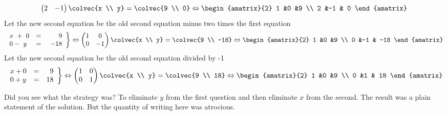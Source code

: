 \begin{example}
\[\begin{pmatrix}
      2             &-1
    \end{pmatrix}
  \colvec{x \\ y}
  =
  \colvec{9 \\ 0}
  \Leftrightarrow
 \begin{amatrix}{2}
1 &0 &9 \\ 2 &-1 & 0
\end{amatrix}
\]
Let the new second equation be the old second equation minus two times the first equation 
\[
   \left.
\begin{array}{lcr}
	x\ +\ 0 & = & 9 \\
	0-\ y & = &\  -18
     \end{array}
   \right\} 
   \Leftrightarrow
    \begin{pmatrix}
      1             &0  \\
      0             &-1
    \end{pmatrix}
  \colvec{x \\ y}
  =
  \colvec{9 \\ -18}
  \Leftrightarrow
 \begin{amatrix}{2}
1 &0 &9 \\ 0 &-1 & -18
\end{amatrix}
\]
Let the new  second equation be the old second equation divided by -1
\[
   \left.
\begin{array}{lcr}
	x + 0 & = & \ 9 \\
	0 + y & = &  18
     \end{array}
   \right\} 
   \Leftrightarrow
    \begin{pmatrix}
      1             &0  \\
      0             &1
    \end{pmatrix}
  \colvec{x \\ y}
  =
  \colvec{9 \\ 18}
  \Leftrightarrow
 \begin{amatrix}{2}
1 &0 &9 \\ 0 &1 & 18
\end{amatrix}
\]
\end{example}
Did you see what the strategy was? To eliminate $y$ from the first question and then eliminate $x$ from the second. The result was a plain statement of the solution. But the quantity of writing here was atrocious. 

